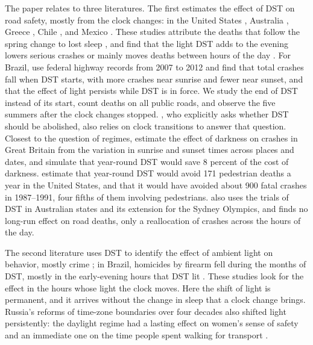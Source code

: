 The paper relates to three literatures. The first estimates the effect of DST on road safety, mostly from the clock changes: in the United States \citep{sood2007short, smith2016spring}, Australia \citep{james2023let}, Greece \citep{laliotis2023summertime}, Chile \citep{gillmore2025daylight}, and Mexico \citep{goodwin2024impact}. These studies attribute the deaths that follow the spring change to lost sleep \citep{smith2016spring, gillmore2025daylight}, and find that the light DST adds to the evening lowers serious crashes \citep{laliotis2023summertime, gillmore2025daylight} or mainly moves deaths between hours of the day \citep{smith2016spring}. For Brazil, \citet{franco2023daylight} use federal highway records from 2007 to 2012 and find that total crashes fall when DST starts, with more crashes near sunrise and fewer near sunset, and that the effect of light persists while DST is in force. We study the end of DST instead of its start, count deaths on all public roads, and observe the five summers after the clock changes stopped. \citet{depalo2023should}, who explicitly asks whether DST should be abolished, also relies on clock transitions to answer that question. Closest to the question of regimes, \citet{bunnings2021spring} estimate the effect of darkness on crashes in Great Britain from the variation in sunrise and sunset times across places and dates, and simulate that year-round DST would save 8 percent of the cost of darkness. \citet{coate2004effects} estimate that year-round DST would avoid 171 pedestrian deaths a year in the United States, and \citet{ferguson1995daylight} that it would have avoided about 900 fatal crashes in 1987--1991, four fifths of them involving pedestrians. \citet{james2023let} also uses the trials of DST in Australian states and its extension for the Sydney Olympics, and finds no long-run effect on road deaths, only a reallocation of crashes across the hours of the day.

The second literature uses DST to identify the effect of ambient light on behavior, mostly crime \citep{doleac2015under, tealde2022unequal, dominguez2023crime}; in Brazil, homicides by firearm fell during the months of DST, mostly in the early-evening hours that DST lit \citep{toro2016daylight}. These studies look for the effect in the hours whose light the clock moves. Here the shift of light is permanent, and it arrives without the change in sleep that a clock change brings. Russia's reforms of time-zone boundaries over four decades also shifted light persistently: the daylight regime had a lasting effect on women's sense of safety and an immediate one on the time people spent walking for transport \citep{jelnov2027sunset}.

